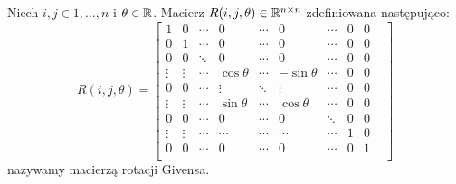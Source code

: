 \documentclass[notheorems]{beamer}
\newcommand{\mx}[1]{{#1}}
\begin{document}
\begin{frame}
\begin{definition}
Niech $ i,j \in {1, \ldots, n}$ i $\theta \in \mathbb{R}$. Macierz $\mx{R}(i,j,\theta) \in \setR^{n\times n}$ zdefiniowana następująco:
$$
\mx{R}(i,j,\theta) = \begin{bmatrix}
1       & 0     & \cdots &    0       & \cdots &    0       & \cdots & 0 & 0& \\
0       & 1     & \cdots &     0      & \cdots &     0      &  \cdots& 0 & 0 &   \\
0       & 0     & \ddots &     0      &  \cdots&     0      &  \cdots& 0 & 0 &  \\
\vdots  &\vdots &  \cdots& \cos\theta & \cdots & -\sin\theta&  \cdots& 0 & 0& \\
0       &  0    & \cdots & \vdots     &  \ddots&  \vdots    & \cdots & 0 & 0& \\
\vdots  & \vdots& \cdots & \sin\theta & \cdots & \cos\theta &  \cdots& 0 & 0& \\
0       & 0     & \cdots &    0       &  \cdots&  0         & \ddots &  0& 0& \\
\vdots  & \vdots&\cdots  &  \cdots    &  \cdots&  \cdots    & \cdots & 1 & 0&\\
0       & 0     & \cdots &     0      &  \cdots&    0       &  \cdots& 0 & 1 & \\       
\end{bmatrix}
$$
nazywamy macierzą rotacji Givensa.
\end{definition}
\end{frame}
\end{document}
